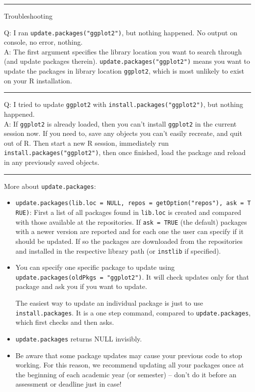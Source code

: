 \documentclass[
  a4paper,
  twoside,
  openright]{book}
\theoremstyle{definition}
\theoremstyle{definition}
\theoremstyle{definition}
\theoremstyle{definition}
\theoremstyle{remark}
\begin{document}
\begin{center}\rule{0.5\linewidth}{0.5pt}\end{center}

{Troubleshooting}

Q: I ran \texttt{update.packages("ggplot2")}, but nothing happened. No output on console, no error, nothing.\\
A: The first argument specifies the library location you want to search through (and update packages therein). \texttt{update.packages("ggplot2")} means you want to update the packages in library location \texttt{ggplot2}, which is most {unlikely} to exist on your R installation.

\begin{center}\rule{0.5\linewidth}{0.5pt}\end{center}

Q: I tried to update \texttt{ggplot2} with \texttt{install.packages("ggplot2")}, but nothing happened.\\
A: {If \texttt{ggplot2} is already loaded}, then you can't install \texttt{ggplot2} in the current session now. If you need to, save any objects you can't easily recreate, and quit out of R. Then start a new R session, immediately run \texttt{install.packages("ggplot2")}, then once finished, load the package and reload in any previously saved objects.

\begin{center}\rule{0.5\linewidth}{0.5pt}\end{center}

More about \texttt{update.packages}:

\begin{itemize}
\item
  \texttt{update.packages(lib.loc\ =\ NULL,\ repos\ =\ getOption("repos"),\ ask\ =\ TRUE)}: First a list of all packages found in \texttt{lib.loc} is created and compared with those available at the repositories. If \texttt{ask\ =\ TRUE} (the default) packages with a newer version are reported and for each one the user can specify if it should be updated. If so the packages are downloaded from the repositories and installed in the respective library path (or \texttt{instlib} if specified).
\item
  You can specify one specific package to update using \texttt{update.packages(oldPkgs\ =\ "ggplot2")}. It will check updates only for that package and ask you if you want to update.

  The easiest way to update an individual package is just to use \texttt{install.packages}. It is a one step command, compared to \texttt{update.packages}, which first checks and then asks.
\item
  \texttt{update.packages} returns NULL invisibly.
\item
  Be aware that some package updates may cause your previous code to stop working. For this reason, we recommend updating all your packages once at the beginning of each academic year (or semester) -- don't do it before an assessment or deadline just in case!
\end{itemize}
\end{document}
